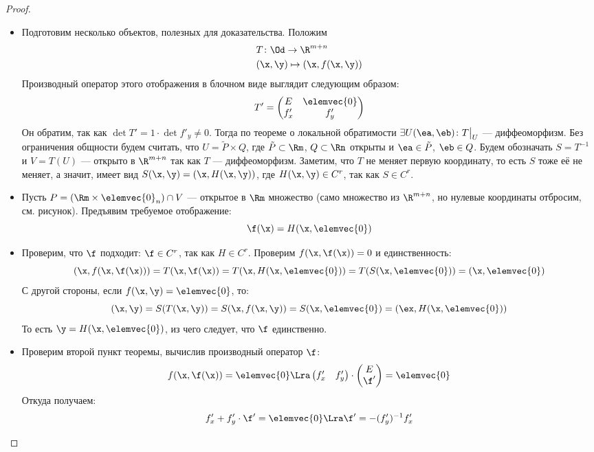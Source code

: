 \begin{proof}
    \enewline
    \begin{itemize}
        \item Подготовим несколько объектов, полезных для доказательства.
        Положим
\begin{align*}
    &T \colon \Od \to \R^{m + n} \\
    &(\x, \y) \mapsto (\x, f(\x, \y))
\end{align*}
        Производный оператор этого отображения в блочном виде выглядит следующим
        образом:
\[
        T' = \begin{pmatrix}
                E & \elemvec{0} \\
                f'_x & f'_y
             \end{pmatrix}
\]
        Он обратим, так как $\det{T'} = 1 \cdot \det{f'_y} \neq 0$. Тогда по теореме о локальной
        обратимости $\exists U(\ea, \eb)\colon T\big|_U$
        --- диффеоморфизм. Без ограничения общности будем считать, что
        $U = \tilde{P} \times Q$, где $\tilde{P} \subset \Rm$, $Q \subset \Rn$
        открыты и $\ea \in \tilde{P}$, $\eb \in Q$. Будем обозначать
        $S = T^{-1}$ и $V = T(U)$ --- открыто в $\R^{m + n}$ так как $T$ --- диффеоморфизм.
        Заметим, что $T$ не меняет первую координату, то есть $S$ тоже её не меняет,
        а значит, имеет вид $S(\x, \y) = (\x, H(\x, \y))$, где $H(\x, \y) \in C^r$,
        так как $S \in C^r$.

        \item Пусть $P = (\Rm \times \elemvec{0}_n) \cap V$ --- открытое в
        $\Rm$ множество (само множество из $\R^{m + n}$, но нулевые координаты
        отбросим, см. рисунок). Предъявим требуемое отображение:
\[
    \f(\x) = H(\x, \elemvec{0})
\]

        \item Проверим, что $\f$ подходит: $\f \in C^r$, так как
        $H \in C^r$. Проверим $f(\x, \f(\x)) = 0$ и единственность:
\[
    (\x, f(\x, \f(\x))) = T(\x, \f(\x)) = T(\x, H(\x, \elemvec{0})) =
    T(S(\x, \elemvec{0})) = (\x, \elemvec{0})
\]
        С другой стороны, если $f(\x, \y) = \elemvec{0}$, то:
\[
	(\x, \y) = S(T(\x, \y)) = S(\x, f(\x, \y)) = S(\x, \elemvec{0}) = 
	(\ex, H(\x, \elemvec{0}))
\]
        То есть $\y = H(\x, \elemvec{0})$, из чего следует, что $\f$ единственно.

        \item Проверим второй пункт теоремы, вычислив производный оператор $\f$:
\[
    f(\x, \f(\x)) = \elemvec{0} \Lra \begin{pmatrix}
                                f'_x & f'_y
                           \end{pmatrix}
                           \cdot
                           \begin{pmatrix}
                               E \\
                               \f'
                           \end{pmatrix} = \elemvec{0}
\]
    Откуда получаем:
\[
    f'_x + f'_y \cdot \f' = \elemvec{0} \Lra \f' = -(f'_y)^{-1}f'_x
\]
    \end{itemize}
\end{proof}

